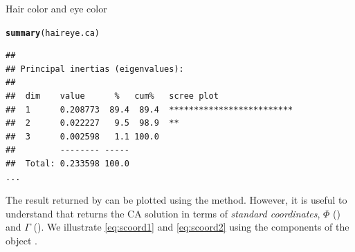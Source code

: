 \documentclass[11pt]{book}\usepackage[]{graphicx}\usepackage[]{color}
\makeatletter
\newcommand{\hlstd}[1]{\textcolor[rgb]{0.345,0.345,0.345}{#1}}%
\newcommand{\hlkwd}[1]{\textcolor[rgb]{0.737,0.353,0.396}{\textbf{#1}}}%
\newenvironment{kframe}{%
 \def\at@end@of@kframe{}%
 \ifinner\ifhmode%
  \def\at@end@of@kframe{\end{minipage}}%
  \begin{minipage}{\columnwidth}%
 \fi\fi%
 \def\FrameCommand##1{\hskip\@totalleftmargin \hskip-\fboxsep
 \colorbox{shadecolor}{##1}\hskip-\fboxsep
     \hskip-\linewidth \hskip-\@totalleftmargin \hskip\columnwidth}%
 \MakeFramed {\advance\hsize-\width
   \@totalleftmargin\z@ \linewidth\hsize
   \@setminipage}}%
 {\par\unskip\endMakeFramed%
 \at@end@of@kframe}
\newenvironment{knitrout}{}{} %
\renewenvironment{knitrout}{\small\renewcommand{\baselinestretch}{.85}}{} %
\makeatother
\begin{document}
\begin{Example}[haireye3]{Hair color and eye color}
\begin{knitrout}
\color{fgcolor}\begin{kframe}
\begin{alltt}
\hlkwd{summary}\hlstd{(haireye.ca)}
\end{alltt}
\begin{verbatim}
## 
## Principal inertias (eigenvalues):
## 
##  dim    value      %   cum%   scree plot               
##  1      0.208773  89.4  89.4  *************************
##  2      0.022227   9.5  98.9  **                       
##  3      0.002598   1.1 100.0                           
##         -------- -----                                 
##  Total: 0.233598 100.0                                 
...
\end{verbatim}
\end{kframe}
\end{knitrout}

The result returned by  can be plotted using the  method. 
However, it is useful to understand that  returns the CA solution
in terms of \emph{standard coordinates}, $\Phi$ () 
and $\Gamma$ (). We illustrate \eqref{eq:scoord1}
and \eqref{eq:scoord2} using the components of the  object
.


\end{Example}
\end{document}

